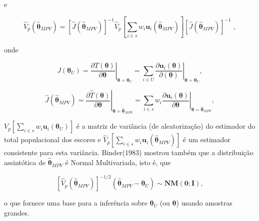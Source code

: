 \documentclass[]{book}
\numberwithin{example}{chapter}
\numberwithin{remark}{chapter}
\numberwithin{definition}{chapter}
\begin{document}
e

\begin{equation}
\hat{V}_{p}\left( \mathbf{\hat{\theta}}_{MPV}\right) =\left[ \hat{J}\left( 
\mathbf{\hat{\theta}}_{MPV}\right) \right] ^{-1}\hat{V}_{p}\left[ \sum_{i\in
s}w_{i}\mathbf{u}_{i}\left( \mathbf{\hat{\theta}}_{MPV}\right) \right]
\left[ \hat{J}\left( \mathbf{\hat{\theta}}_{MPV}\right) \right] ^{-1}\;,
\label{eq:modpar9}
\end{equation}

onde

\begin{equation}
J\left( \mathbf{\theta }_{U}\right) =\left. \frac{\partial T\left( \mathbf{
\theta }\right) }{\partial \mathbf{\theta }}\right| _{\mathbf{\theta =\theta 
}_{U}}=\sum_{i\in U}\left. \frac{\partial \mathbf{u}_{i}\left( \mathbf{
\theta }\right) }{\partial \left( \mathbf{\theta }\right) }\right| _{\mathbf{
\theta =\theta }_{U}},  
\label{eq:modpar10}
\end{equation}

\begin{equation}
\hat{J}\left( \mathbf{\hat{\theta}}_{MPV}\right) =\left. \frac{\partial 
\widehat{T}\left( \mathbf{\theta }\right) }{\partial \mathbf{\theta }}
\right| _{\mathbf{\theta =\hat{\theta}}_{MPV}}=\sum_{i\in s}w_{i}\left. 
\frac{\partial \mathbf{u}_{i}\left( \mathbf{\theta }\right) }{\partial 
\mathbf{\theta }}\right| _{\mathbf{\theta =\hat{\theta}}_{MPV}},
\label{eq:modpar11}
\end{equation}

\(V_{p}\left[\sum_{i\in s}w_{i}\mathbf{u}_{i}\left( \mathbf{\theta}_{U}\right) \right]\)
é a matriz de variância (de aleatorização) do estimador do total
populacional dos escores e
\(\hat{V}_{p}\left[\sum_{i\in s}w_{i}\mathbf{u}_{i}\left(\mathbf{\hat{\theta}}_{MPV}\right)\right]\)
é um estimador consistente para esta variância. Binder(1983) mostrou
também que a distribuição assintótica de \(\mathbf{\hat{\theta}}_{MPV}\)
é Normal Multivariada, isto é, que

\begin{equation}
\left[ \hat{V}_{p}\left( \mathbf{\hat{\theta}}_{MPV}\right) \right]^{-1/2}\left(\mathbf{\hat{\theta}}_{MPV}-\mathbf{\theta }_{U}\right) \sim  \mathbf{NM}\left(\mathbf{0};\mathbf{I}\right),  
\label{eq:modpar12}
\end{equation}

o que fornece uma base para a inferência sobre \(\mathbf{\theta }_{U}\)
(ou \(\mathbf{\theta }\)) usando amostras grandes.
\end{document}
